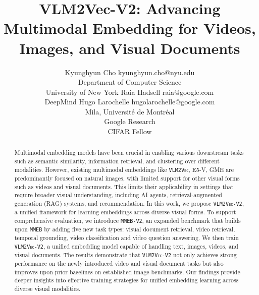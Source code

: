 \documentclass[10pt]{article} %
\title{VLM2Vec-V2: Advancing Multimodal Embedding for Videos, Images, and Visual Documents}
\author{\name Kyunghyun Cho \email kyunghyun.cho@nyu.edu \\
      \addr Department of Computer Science\\
      University of New York
      \AND
      \name Raia Hadsell \email raia@google.com \\
      \addr DeepMind
      \AND
      \name Hugo Larochelle \email hugolarochelle@google.com\\
      \addr Mila, Universit\'e de Montr\'eal \\
      Google Research\\
      CIFAR Fellow}
\newcommand{\model}{\texttt{\textsc{VLM2Vec-V2}}\xspace}
\newcommand{\benchmark}{\texttt{\textsc{MMEB-V2}}\xspace}
\newcommand{\mmeb}{\texttt{\textsc{MMEB}}\xspace}
\newcommand{\vlmvec}{\texttt{\textsc{VLM2Vec}}\xspace}
\begin{document}
\maketitle

\begin{abstract}
Multimodal embedding models have been crucial in enabling various downstream tasks such as semantic similarity, information retrieval, and clustering over different modalities. However, existing multimodal embeddings like \vlmvec, E5-V, GME are predominantly focused on natural images, with limited support for other visual forms such as videos and visual documents. This limits their applicability in settings that require broader visual understanding, including AI agents, retrieval-augmented generation (RAG) systems, and recommendation.
In this work, we propose \model, a unified framework for learning embeddings across diverse visual forms. 
To support comprehensive evaluation, we introduce \benchmark, an expanded benchmark that builds upon \mmeb by adding five new task types: visual document retrieval, video retrieval, temporal grounding, video classification and video question answering.
We then train \model, a unified embedding model capable of handling text, images, videos, and visual documents. The results demonstrate that \model not only achieves strong performance on the newly introduced video and visual document tasks but also improves upon prior baselines on established image benchmarks. Our findings provide deeper insights into effective training strategies for unified embedding learning across diverse visual modalities.
\end{abstract}











\appendix

\end{document}
